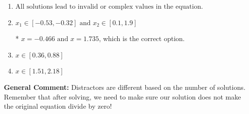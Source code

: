 \documentclass{extbook}[14pt]
\begin{document}
\begin{enumerate}
{\begin{enumerate}[label=\Alph*.]
\item \( \text{All solutions lead to invalid or complex values in the equation.} \)


\item \( x_1 \in [-0.53, -0.32] \text{ and } x_2 \in [0.1,1.9] \)

* $x = -0.466 \text{ and } x = 1.735$, which is the correct option.
\item \( x \in [0.36,0.88] \)


\item \( x \in [1.51,2.18] \)


\end{enumerate}

\textbf{General Comment:} Distractors are different based on the number of solutions. Remember that after solving, we need to make sure our solution does not make the original equation divide by zero!
}
\end{enumerate}
\end{document}
